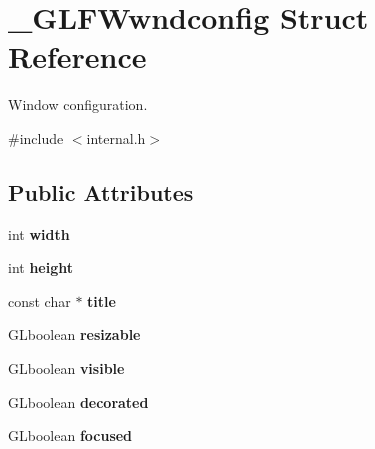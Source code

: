\hypertarget{struct__GLFWwndconfig}{}\section{\+\_\+\+G\+L\+F\+Wwndconfig Struct Reference}
\label{struct__GLFWwndconfig}


Window configuration.  




{\ttfamily \#include $<$internal.\+h$>$}

\subsection*{Public Attributes}
\begin{DoxyCompactItemize}
\item 
\hypertarget{struct__GLFWwndconfig_ab53d90df4a7f5fd67a232501c36ac921}{}int {\bfseries width}\label{struct__GLFWwndconfig_ab53d90df4a7f5fd67a232501c36ac921}

\item 
\hypertarget{struct__GLFWwndconfig_ae1fcd89a1c47ac1a5174636667265154}{}int {\bfseries height}\label{struct__GLFWwndconfig_ae1fcd89a1c47ac1a5174636667265154}

\item 
\hypertarget{struct__GLFWwndconfig_a1b3475dec1fd6198da30c822d8d17e32}{}const char $\ast$ {\bfseries title}\label{struct__GLFWwndconfig_a1b3475dec1fd6198da30c822d8d17e32}

\item 
\hypertarget{struct__GLFWwndconfig_adb9d10db3d22b743421c44b751f90be0}{}G\+Lboolean {\bfseries resizable}\label{struct__GLFWwndconfig_adb9d10db3d22b743421c44b751f90be0}

\item 
\hypertarget{struct__GLFWwndconfig_a23a7a92506c8134f3bc5fdfcd56274f2}{}G\+Lboolean {\bfseries visible}\label{struct__GLFWwndconfig_a23a7a92506c8134f3bc5fdfcd56274f2}

\item 
\hypertarget{struct__GLFWwndconfig_a1dedaa713573ebeba4729480c8dc51b3}{}G\+Lboolean {\bfseries decorated}\label{struct__GLFWwndconfig_a1dedaa713573ebeba4729480c8dc51b3}

\item 
\hypertarget{struct__GLFWwndconfig_a3aa9dcfd0c77952628958b069ba32bc3}{}G\+Lboolean {\bfseries focused}\label{struct__GLFWwndconfig_a3aa9dcfd0c77952628958b069ba32bc3}


\end{DoxyCompactItemize}
